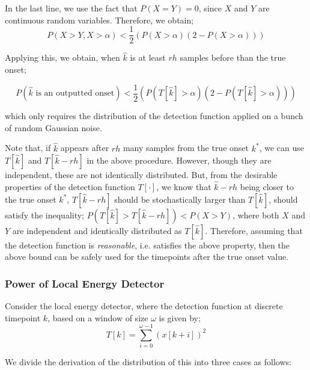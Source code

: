 \documentclass[10pt]{article}
\begin{document}
In the last line, we use the fact that $P(X = Y) = 0$, since $X$ and $Y$ are continuous random variables. Therefore, we obtain;
$$P(X > Y, X> \alpha) < \frac{1}{2}\left( P(X>\alpha) (2 - P(X> \alpha)) \right)$$

Applying this, we obtain, when $\hat{k}$ is at least $rh$ samples before than the true onset; 

$$P\left(\hat{k}\text{ is an outputted onset}\right) < \frac{1}{2}\left( P(T[\hat{k}]>\alpha) (2 - P(T[\hat{k}] > \alpha)) \right)$$

which only requires the distribution of the detection function applied on a bunch of random Gaussian noise.

Note that, if $\hat{k}$ appears after $rh$ many samples from the true onset $k^*$, we can use $T[\hat{k}]$ and $T[\hat{k}-rh]$ in the above procedure. However, though they are independent, these are not identically distributed. But, from the desirable properties of the detection function $T[\cdot]$, we know that $\hat{k}-rh$ being closer to the true onset $k^*$, $T[\hat{k}-rh]$ should be stochastically larger than $T[\hat{k}]$, should satisfy the inequality; $P(T[\hat{k}]> T[\hat{k} - rh]) < P(X > Y)$, where both $X$ and $Y$ are independent and identically distributed as $T[\hat{k}]$. Therefore, assuming that the detection function is \textit{reasonable}, i.e. satisfies the above property, then the above bound can be safely used for the timepoints after the true onset value.

\subsubsection{Power of Local Energy Detector}
\qquad Consider the local energy detector, where the detection function at discrete timepoint $k$, based on a window of size $\omega$ is given by;
$$T[k] = \sum_{i=0}^{\omega - 1} (x[k+i])^2$$

We divide the derivation of the distribution of this into three cases as follows:
\end{document}

